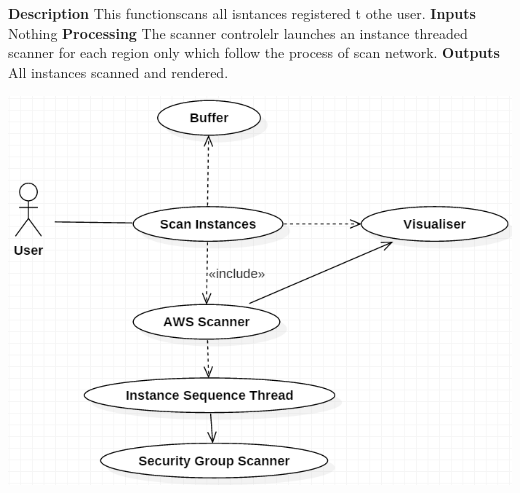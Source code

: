 \documentclass[a4paper,12pt]{report}
\begin{document}
\begin{itemize}
\begin{flushleft}
		\textbf{Description}
	\newline
	This functionscans all isntances registered t othe user.
	\newline
	\textbf{Inputs}
	\newline
	Nothing
	\newline
	\textbf{Processing}
	\newline
	The scanner controlelr launches an instance threaded scanner for each region only which  follow the process of scan network.
	\newline
	\textbf{Outputs}
	\newline
	All instances scanned and rendered.
	\end{flushleft}
	\begin{center}
		\includegraphics[width=1\textwidth] {./Diagrams/ScanInstancesUseCase.png}\\[0.4cm]    
	\end{center}

\end{itemize}
\newpage
\end{document}
